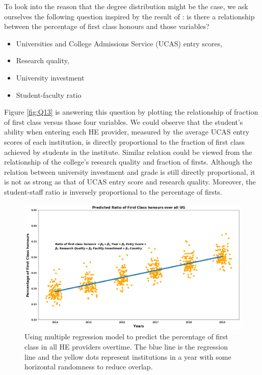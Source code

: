 \documentclass[11pt,a4paper]{article}
\begin{document}
To look into the reason that the degree distribution might be the case, we ask ourselves the following question inspired by the result of \cite{BayMain}: is there a relationship between the percentage of first class honours and those variables? 

\begin{itemize}
    \item Universities and College Admissions Service (UCAS) entry scores, 
    \item Research quality, 
    \item University investment 
    \item Student-faculty ratio
\end{itemize}

Figure \ref{fig:Q13} is answering this question by plotting the relationship of fraction of first class versus those four variables. We could observe that the student's ability when entering each HE provider, measured by the average UCAS entry scores of each institution, is directly proportional to the fraction of first class achieved by students in the institute. Similar relation could be viewed from the relationship of the college's research quality and fraction of firsts. Although the relation between university investment and grade is still directly proportional, it is not as strong as that of UCAS entry score and research quality. Moreover, the student-staff ratio is inversely proportional to the percentage of firsts. 


\begin{figure}[h]
    \centering
    \includegraphics[width=15.24cm]{report/Q22FFF.pdf}
    \caption{Using multiple regression model to predict the percentage of first class in all HE providers overtime. The blue line is the regression line and the yellow dots represent institutions in a year with some horizontal randomness to reduce overlap. }
    \label{fig:Q22}
\end{figure}
\end{document}
